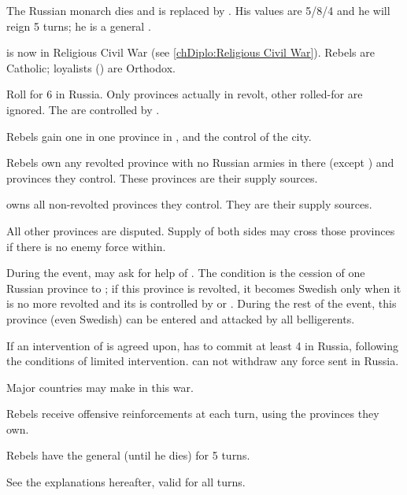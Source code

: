 
\phevnt

\aparag The Russian monarch dies and is replaced by .
His values are 5/8/4 and he will reign 5 turns; he is a general
.

\aparag \RUS is now in Religious Civil War (see \ref{chDiplo:Religious Civil
  War}). Rebels are Catholic; loyalists (\RUS) are Orthodox.

\aparag Roll for 6 \REVOLT in Russia. Only provinces actually in \RUS revolt,
other rolled-for are ignored. The \REVOLT are controlled by \POL.

\aparag Rebels gain one \ARMY\faceplus in one province in \REVOLT, and the
control of the city.

\aparag Rebels own any revolted province with no Russian armies in there
(except ) and provinces they control. These provinces are
their supply sources.

\aparag \RUS owns all non-revolted provinces they control. They are their
supply sources.

\aparag All other provinces are disputed. Supply of both sides may cross those
provinces if there is no enemy force within.

\phdipl

\aparag During the event, \RUS may ask for help of \SUE. The condition is the
cession of one Russian province to \SUE; if this province is revolted, it
becomes Swedish only when it is no more revolted and its is controlled by \RUS
or \SUE. During the rest of the event, this province (even Swedish) can be
entered and attacked by all belligerents.

\bparag If an intervention of \SUE is agreed upon, \SUE has to commit at least
4 \LD in Russia, following the conditions of limited intervention.  \SUE can
not withdraw any force sent in Russia.

\aparag Major countries may make  in this war.

\phadm

\aparag Rebels receive offensive reinforcements at each turn, using the
provinces they own.

\aparag Rebels have the general \leaderDmitry (until he dies) for 5 turns.

\phpaix

\aparag See the explanations hereafter, valid for all turns.



